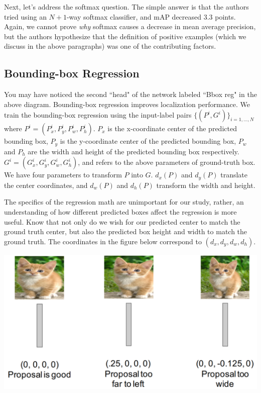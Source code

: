 \documentclass{article}
\begin{document}
Next, let's address the softmax question. The simple answer is that the authors tried using an $N+1$-way softmax classifier, and mAP decreased $3.3$ points. Again, we cannot prove \textit{why} softmax causes a decrease in mean average precision, but the authors hypothesize that the definition of positive examples (which we discuss in the above paragraphs) was one of the contributing factors.

\subsection{Bounding-box Regression}
You may have noticed the second ``head" of the network labeled ``Bbox reg" in the above diagram. Bounding-box regression improves localization performance. We train the bounding-box regression using the input-label pairs $\{(P^i, G^i)\}_{i=1,\dots,N}$ where $P^i = (P^i_x, P^i_y, P^i_w, P^i_h)$. $P_x$ is the x-coordinate center of the predicted bounding box, $P_y$ is the y-coordinate center of the predicted bounding box, $P_w$ and $P_h$ are the width and height of the predicted bounding box respectively. $G^i = (G^i_x, G^i_y, G^i_w, G^i_h)$, and refers to the above parameters of ground-truth box. We have four parameters to transform $P$ into $G$. $d_x(P)$ and $d_y(P)$ translate the center coordinates, and $d_w(P)$ and $d_h(P)$ transform the width and height.

The specifics of the regression math are unimportant for our study, rather, an understanding of how different predicted boxes affect the regression is more useful. Know that not only do we wish for our predicted center to match the ground truth center, but also the predicted box height and width to match the ground truth. The coordinates in the figure below correspond to $(d_x, d_y, d_w, d_h)$.

\begin{center}
\includegraphics[scale=0.45]{bbox.PNG}
\end{center}
\end{document}
